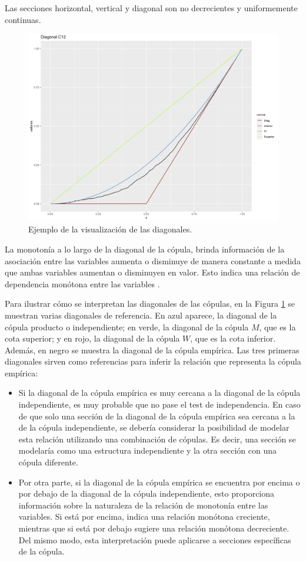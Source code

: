 \begin{corl}
    Las secciones horizontal, vertical y diagonal son no decrecientes y uniformemente continuas.
\end{corl}

\begin{figure}[H]
    \centering
    \includegraphics[width =  0.6 \textwidth]{4img/DiagMujC12.png}
    \caption{Ejemplo de la visualización de las diagonales.}
    \label{fig:diagEj}
\end{figure}

La monotonía a lo largo de la diagonal de la cópula, brinda información de la asociación entre las variables aumenta o disminuye de manera constante a medida que ambas variables aumentan o disminuyen en valor. Esto indica una relación de dependencia monótona entre las variables \cite{TesisEmanuel}.

Para ilustrar cómo se interpretan las diagonales de las cópulas, en la Figura \ref{fig:diagEj} se muestran varias diagonales de referencia. En azul aparece, la diagonal de la cópula producto o independiente; en verde, la diagonal de la cópula $M$, que es la cota superior; y en rojo, la diagonal de la cópula $W$, que es la cota inferior. Además, en negro se muestra la diagonal de la cópula empírica. Las tres primeras diagonales sirven como referencias para inferir la relación que representa la cópula empírica:

\begin{itemize}
    \item Si la diagonal de la cópula empírica es muy cercana a la diagonal de la cópula independiente, es muy probable que no pase el test de independencia. En caso de que solo una sección de la diagonal de la cópula empírica sea cercana a la de la cópula independiente, se debería considerar la posibilidad de modelar esta relación utilizando una combinación de cópulas. Es decir, una sección se modelaría como una estructura independiente y la otra sección con una cópula diferente.

    \item Por otra parte, si la diagonal de la cópula empírica se encuentra por encima o por debajo de la diagonal de la cópula independiente, esto proporciona información sobre la naturaleza de la relación de monotonía entre las variables. Si está por encima, indica una relación monótona creciente, mientras que si está por debajo sugiere una relación monótona decreciente. Del mismo modo, esta interpretación puede aplicarse a secciones específicas de la cópula.
\end{itemize}

